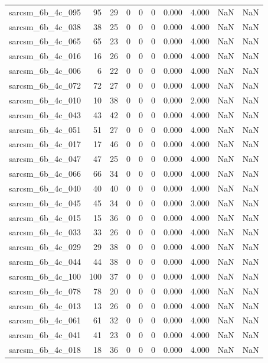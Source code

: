 \documentclass{article}
\begin{document}
\begin{longtable}{lrrrrrrrrr}
sarcsm\_6b\_4c\_095 & 95 & 29 & 0 & 0 & 0 & 0.000 & 4.000 & NaN & NaN \\
sarcsm\_6b\_4c\_038 & 38 & 25 & 0 & 0 & 0 & 0.000 & 4.000 & NaN & NaN \\
sarcsm\_6b\_4c\_065 & 65 & 23 & 0 & 0 & 0 & 0.000 & 4.000 & NaN & NaN \\
sarcsm\_6b\_4c\_016 & 16 & 26 & 0 & 0 & 0 & 0.000 & 4.000 & NaN & NaN \\
sarcsm\_6b\_4c\_006 & 6 & 22 & 0 & 0 & 0 & 0.000 & 4.000 & NaN & NaN \\
sarcsm\_6b\_4c\_072 & 72 & 27 & 0 & 0 & 0 & 0.000 & 4.000 & NaN & NaN \\
sarcsm\_6b\_4c\_010 & 10 & 38 & 0 & 0 & 0 & 0.000 & 2.000 & NaN & NaN \\
sarcsm\_6b\_4c\_043 & 43 & 42 & 0 & 0 & 0 & 0.000 & 4.000 & NaN & NaN \\
sarcsm\_6b\_4c\_051 & 51 & 27 & 0 & 0 & 0 & 0.000 & 4.000 & NaN & NaN \\
sarcsm\_6b\_4c\_017 & 17 & 46 & 0 & 0 & 0 & 0.000 & 4.000 & NaN & NaN \\
sarcsm\_6b\_4c\_047 & 47 & 25 & 0 & 0 & 0 & 0.000 & 4.000 & NaN & NaN \\
sarcsm\_6b\_4c\_066 & 66 & 34 & 0 & 0 & 0 & 0.000 & 4.000 & NaN & NaN \\
sarcsm\_6b\_4c\_040 & 40 & 40 & 0 & 0 & 0 & 0.000 & 4.000 & NaN & NaN \\
sarcsm\_6b\_4c\_045 & 45 & 34 & 0 & 0 & 0 & 0.000 & 3.000 & NaN & NaN \\
sarcsm\_6b\_4c\_015 & 15 & 36 & 0 & 0 & 0 & 0.000 & 4.000 & NaN & NaN \\
sarcsm\_6b\_4c\_033 & 33 & 26 & 0 & 0 & 0 & 0.000 & 4.000 & NaN & NaN \\
sarcsm\_6b\_4c\_029 & 29 & 38 & 0 & 0 & 0 & 0.000 & 4.000 & NaN & NaN \\
sarcsm\_6b\_4c\_044 & 44 & 38 & 0 & 0 & 0 & 0.000 & 4.000 & NaN & NaN \\
sarcsm\_6b\_4c\_100 & 100 & 37 & 0 & 0 & 0 & 0.000 & 4.000 & NaN & NaN \\
sarcsm\_6b\_4c\_078 & 78 & 20 & 0 & 0 & 0 & 0.000 & 4.000 & NaN & NaN \\
sarcsm\_6b\_4c\_013 & 13 & 26 & 0 & 0 & 0 & 0.000 & 4.000 & NaN & NaN \\
sarcsm\_6b\_4c\_061 & 61 & 32 & 0 & 0 & 0 & 0.000 & 4.000 & NaN & NaN \\
sarcsm\_6b\_4c\_041 & 41 & 23 & 0 & 0 & 0 & 0.000 & 4.000 & NaN & NaN \\
sarcsm\_6b\_4c\_018 & 18 & 36 & 0 & 0 & 0 & 0.000 & 4.000 & NaN & NaN \\

\end{longtable}
\end{document}
